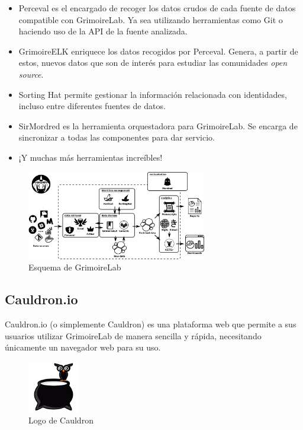 \begin{itemize}
    \item Perceval es el encargado de recoger los datos crudos de cada fuente de datos compatible con GrimoireLab. Ya sea utilizando herramientas como Git o haciendo uso de la API de la fuente analizada.
    \item GrimoireELK enriquece los datos recogidos por Perceval. Genera, a partir de estos, nuevos datos que son de interés para estudiar las comunidades \emph{open source}.
    \item Sorting Hat permite gestionar la información relacionada con identidades, incluso entre diferentes fuentes de datos.
    \item SirMordred es la herramienta orquestadora para GrimoireLab. Se encarga de sincronizar a todas las componentes para dar servicio.
    \item ¡Y muchas más herramientas increíbles!
\end{itemize}

\begin{figure}[ht]
    \centering
    \includegraphics[width=0.7\textwidth]{Figures/grimoirelab-schema}
    \decoRule
    \caption[GrimoireLab (Esquema)]{Esquema de GrimoireLab \emph{\parencite{Reference12}}}
    \label{fig:grimoirelab-schema}
\end{figure}

\subsection{Cauldron.io}\label{sec:cauldron}

Cauldron.io (o simplemente Cauldron) es una plataforma web que permite a sus usuarios utilizar GrimoireLab de manera sencilla y rápida, necesitando únicamente un navegador web para su uso. \emph{\parencite{Reference13}}

\begin{figure}[ht]
    \centering
    \includegraphics[width=0.2\textwidth]{Figures/cauldron-logo}
    \decoRule
    \caption[Cauldron (Logo)]{Logo de Cauldron \emph{\parencite{Reference13}}}
    \label{fig:cauldron-logo}
\end{figure}

